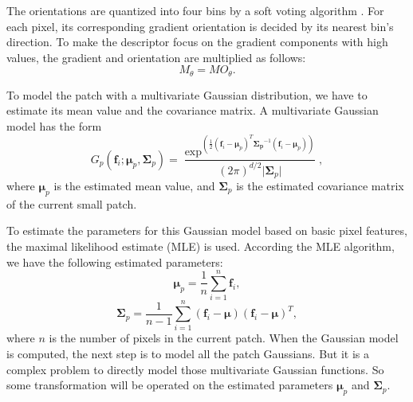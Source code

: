 The orientations are quantized into four bins by a soft voting algorithm \cite{AutoRela}. For each pixel, its corresponding gradient orientation is decided by its nearest bin's direction. To make the descriptor focus on the gradient components with high values, the gradient and orientation are multiplied as follows:
\begin{equation}
M_{\theta} = MO_{\theta}.
\end{equation}


To model the patch with a multivariate Gaussian distribution, we have to estimate its mean value and the covariance matrix. A multivariate Gaussian model has the form
\begin{equation}
G_p(\bm{f}_i;\bm{\mu}_p,\bm{\Sigma}_p) = \frac{\exp^{(\frac{1}{2}(\bm{f}_i-\bm{\mu}_p)^T\bm{\Sigma_p}^{-1}(\bm{f}_i-\bm{\mu}_p))}}{(2\pi)^{d/2}|{\bm{\Sigma}_p|}}, 
\end{equation}
where $\bm {\mu}_p$ is the estimated mean value, and $\bm {\Sigma}_p $ is the estimated covariance matrix of the current small patch. 

To estimate the parameters for this Gaussian model based on basic pixel features, the maximal likelihood estimate (MLE) is used. According the MLE algorithm, we have the following estimated parameters:
\begin{equation}
\bm{\mu}_p = \frac{1}{n}\sum_{i = 1}^n \bm{f}_i,
\end{equation}
\begin{equation}
\bm{\Sigma}_p = \frac{1}{n-1} \sum_{i = 1}^n(\bm{f}_i-\bm{\mu})(\bm{f}_i-\bm{\mu})^T,
\end{equation}
where $n$ is the number of pixels in the current patch. When the Gaussian model is computed, the next step is to model all the patch Gaussians. But it is a complex problem to directly model those multivariate Gaussian functions. So some transformation will be operated on the estimated parameters $\bm{\mu}_p$ and $\bm{\Sigma}_p$.


